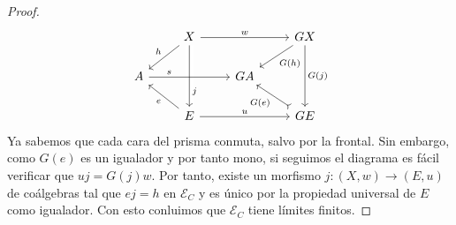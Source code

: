 \begin{proof}
  \begin{equation*}
    \begin{tikzcd}
      {} & X\ar{rr}{w}\ar[swap]{ld}{h}\ar[crossing over, near end]{dd}{j} & {} & GX\ar{ld}{G(h)}\ar{dd}{G(j)} \\
      A\ar[near start]{rr}{s} & {} & GA & {} \\
      {} & E\ar{lu}{e}\ar{rr}{u} & {} & GE\ar[tail]{lu}{G(e)} 
    \end{tikzcd}
  \end{equation*}
  Ya sabemos que cada cara del prisma conmuta, salvo por la frontal. Sin embargo, como $G(e)$ es un igualador
  y por tanto mono, si seguimos el diagrama es fácil verificar que $uj=G(j)w$. Por tanto, existe un morfismo 
  $j\colon (X,w)\to (E,u)$ de coálgebras tal que $ej=h$ en $\mathcal{E}_C$ y es único por la propiedad universal de $E$ como igualador. 
  Con esto conluimos que $\mathcal{E}_C$ tiene límites finitos.
\end{proof}

